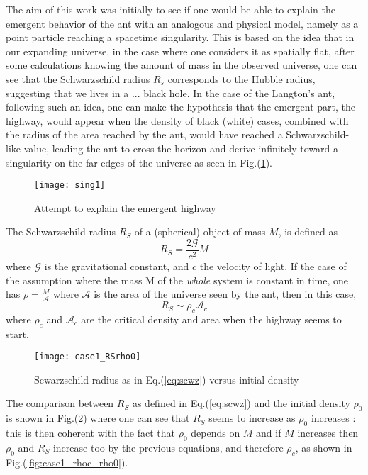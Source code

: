 \documentclass[twocolumn]{revtex4}
\begin{document}
The aim of this work was initially to see if one would be able to explain the emergent behavior of the ant with an analogous and physical model, namely as a point particle reaching a spacetime singularity. This is based on the idea that in our expanding universe, in the case where one considers it as spatially flat, after some calculations \cite{Carroll} knowing the amount of mass in the observed universe, one can see that the Schwarzschild radius $R_s$ corresponds to the Hubble radius, suggesting that we lives in a ... black hole. In the case of the Langton's ant, following such an idea, one can make the hypothesis that the emergent part, the highway, would appear when the density of  black (white) cases, combined with the radius of the area reached by the ant, would have reached a Schwarzschild-like value, leading the ant to cross the horizon and derive infinitely toward a singularity on the far edges of the universe as seen in Fig.(\ref{fig:modelszh}). 


\begin{figure}[htb]
\texttt{[image: sing1]}
\caption{Attempt to explain the emergent highway}
\label{fig:modelszh}
\end{figure}


The Schwarzschild radius $R_S$ of a (spherical) object of mass $M$, is defined as 
\begin{equation}
R_S = \frac{2 \mathcal{G}}{c^2} M
\end{equation}
where $\mathcal{G}$ is the gravitational constant, and $c$ the velocity of light. If the case of the assumption where the mass M of the \textit{whole} system is constant in time, one has $\rho = \frac{M}{\mathcal{A}}$ where $\mathcal{A}$ is the area of the universe seen by the ant, then in this case, 
\begin{equation} \label{eq:scwz}
R_S \sim \rho_c \mathcal{A}_c
\end{equation}
where $\rho_c$ and $\mathcal{A}_c$ are the critical density and area when the highway seems to start.

\begin{figure}[htb] 
\texttt{[image: case1\_RSrho0]}
\caption{Scwarzschild radius as in Eq.(\ref{eq:scwz}) versus initial density}
\label{fig:case1_RSrho0}
\end{figure}

 The comparison between $R_S$ as defined in Eq.(\ref{eq:scwz}) and the initial density $\rho_0$ is shown in Fig.(\ref{fig:case1_RSrho0}) where one can see that $R_S$ seems to increase as $\rho_0$ increases : this is then coherent with the fact that $\rho_0$ depends on $M$ and if $M$ increases then $\rho_0$ and $R_S$ increase too by the previous equations, and therefore $\rho_c$, as shown in Fig.(\ref{fig:case1_rhoc_rho0}). 
 
\end{document}
